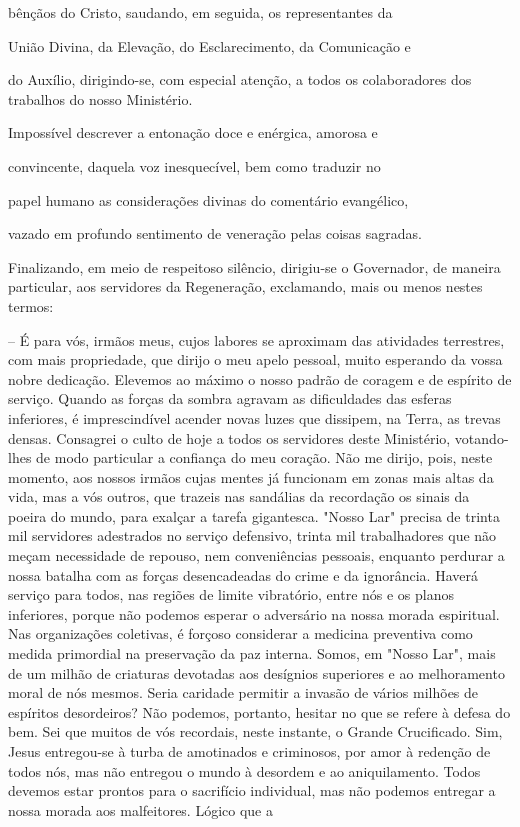 \documentclass[portuguese,12pt,a4paper]{scrbook}
\begin{document}
	bênçãos do Cristo, saudando, em seguida, os representantes da
	
	União Divina, da Elevação, do Esclarecimento, da Comunicação e
	
	do Auxílio, dirigindo-se, com especial atenção, a todos os colaboradores dos trabalhos do nosso Ministério.
	
	Impossível descrever a entonação doce e enérgica, amorosa e
	
	convincente, daquela voz inesquecível, bem como traduzir no
	
	papel humano as considerações divinas do comentário evangélico,
	
	vazado em profundo sentimento de veneração pelas coisas sagradas.
	
	
	Finalizando, em meio de respeitoso silêncio, dirigiu-se o Governador, de maneira particular, aos servidores da Regeneração, exclamando, mais ou menos nestes termos:
	
	– É para vós, irmãos meus, cujos labores se aproximam das atividades terrestres, com mais propriedade, que dirijo o meu apelo pessoal, muito esperando da vossa nobre dedicação. Elevemos ao máximo o nosso padrão de coragem e de espírito de serviço. Quando as forças da sombra agravam as dificuldades das esferas inferiores, é imprescindível acender novas luzes que dissipem, na Terra, as trevas densas. Consagrei o culto de hoje a todos os servidores deste Ministério, votando-lhes de modo particular a confiança do meu coração. Não me dirijo, pois, neste momento, aos nossos irmãos cujas mentes já funcionam em zonas mais altas da vida, mas a vós outros, que trazeis nas sandálias da recordação os sinais da poeira do mundo, para exalçar a tarefa gigantesca. "Nosso Lar" precisa de trinta mil servidores adestrados no serviço defensivo, trinta mil trabalhadores que não meçam necessidade de repouso, nem conveniências pessoais, enquanto perdurar a nossa batalha com as forças desencadeadas do crime e da ignorância. Haverá serviço para todos, nas regiões de limite vibratório, entre nós e os planos inferiores, porque não podemos esperar o adversário na nossa morada espiritual. Nas organizações coletivas, é forçoso considerar a medicina preventiva como medida primordial na preservação da paz interna. Somos, em "Nosso Lar", mais de um milhão de criaturas devotadas aos desígnios superiores e ao melhoramento moral de nós mesmos. Seria caridade permitir a invasão de vários milhões de espíritos desordeiros? Não podemos, portanto, hesitar no que se refere à defesa do bem. Sei que muitos de vós recordais, neste instante, o Grande Crucificado. Sim, Jesus entregou-se à turba de amotinados e criminosos, por amor à redenção de todos nós, mas não entregou o mundo à desordem e ao aniquilamento. Todos devemos estar prontos para o sacrifício individual, mas não podemos entregar a nossa morada aos malfeitores. Lógico que a
	
\end{document}
